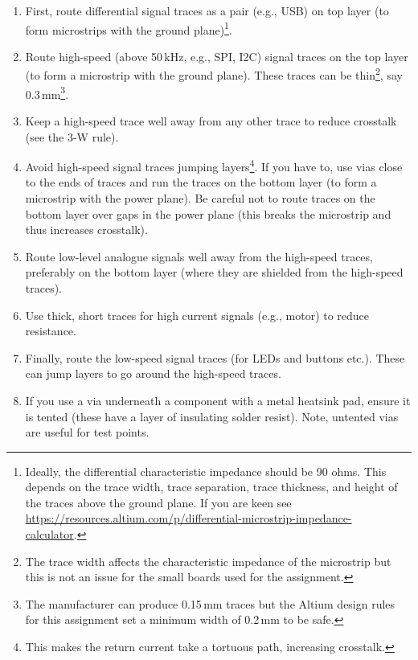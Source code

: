 \begin{enumerate}

\item First, route differential signal traces as a pair (e.g., USB) on
  top layer (to form microstrips with the ground
  plane)\footnote{Ideally, the differential characteristic impedance
    should be 90 ohms.  This depends on the trace width, trace
    separation, trace thickness, and height of the traces above the
    ground plane.  If you are keen see \url{
 https://resources.altium.com/p/differential-microstrip-impedance-calculator}.}.

\item Route high-speed (above 50\,kHz, e.g., SPI, I2C) signal traces
  on the top layer (to form a microstrip with the ground plane).
  These traces can be thin\footnote{The trace width affects the
    characteristic impedance of the microstrip but this is not an
    issue for the small boards used for the assignment.}, say
  0.3\,mm\footnote{The manufacturer can produce 0.15\,mm traces but
    the Altium design rules for this assignment set a minimum width of
    0.2\,mm to be safe.}.

\item Keep a high-speed trace well away from any other trace to reduce
  crosstalk (see the 3-W rule).

\item Avoid high-speed signal traces jumping layers\footnote{This
  makes the return current take a tortuous path, increasing
  crosstalk.}.  If you have to, use vias close to the ends of traces
  and run the traces on the bottom layer (to form a microstrip with
  the power plane).  Be careful not to route traces on the bottom
  layer over gaps in the power plane (this breaks the microstrip and
  thus increases crosstalk).

\item Route low-level analogue signals well away from the high-speed
  traces, preferably on the bottom layer (where they are shielded from
  the high-speed traces).

\item Use thick, short traces for high current signals (e.g., motor)
  to reduce resistance.

\item Finally, route the low-speed signal traces (for LEDs and buttons
  etc.).  These can jump layers to go around the high-speed traces.

\item If you use a via underneath a component with a metal heatsink
  pad, ensure it is tented (these have a layer of insulating solder
  resist).  Note, untented vias are useful for test points.
\end{enumerate}

